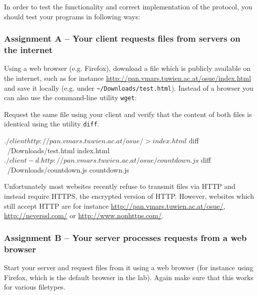 \vspace{-5mm}
In order to test the functionality and correct implementation of the protocol,
you should test your programs in following ways:

\vspace{-4mm}

\subsubsection*{Assignment A -- Your client requests files from servers on the internet}

\vspace{-4mm}
Using a web browser (e.g. Firefox),
download a file which is publicly available on the internet,
such as for instance \url{http://pan.vmars.tuwien.ac.at/osue/index.html}
and save it locally (e.g. under \verb|~/Downloads/test.html|).
Instead of a browser you can also use the command-line utility \verb|wget|:


Request the same file using your client
and verify that the content of both files is identical using the utility \verb|diff|.

\begin{osuefmtcode}
    $ ./client http://pan.vmars.tuwien.ac.at/osue/ > index.html
    $ diff ~/Downloads/test.html index.html
    $ ./client -d . http://pan.vmars.tuwien.ac.at/osue/countdown.js
    $ diff ~/Downloads/countdown.js countdown.js
\end{osuefmtcode}

Unfortunately most websites recently refuse to transmit files via HTTP
and instead require HTTPS, the encrypted version of HTTP.
However, websites which still accept HTTP are for instance
\url{http://pan.vmars.tuwien.ac.at/osue/},
\url{http://neverssl.com/} or \url{http://www.nonhttps.com/}.

\subsubsection*{Assignment B -- Your server processes requests from a web browser}

\vspace{-4mm}
Start your server and request files from it using a web browser
(for instance using Firefox, which is the default browser in the lab).
Again make sure that this works for various filetypes.

